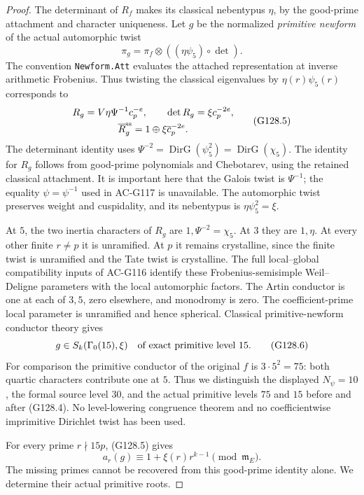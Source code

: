 \begin{proof}
The determinant of \(R_f\) makes its classical nebentypus
\(\eta\), by the good-prime attachment and character uniqueness.
Let \(g\) be the normalized \emph{primitive newform} of the
actual automorphic twist
\[
                 \pi_g=\pi_f\otimes((\eta\psi_5)\circ\det).
 \tag{G128.4}
\]
The convention \texttt{Newform.Att} evaluates the attached
representation at inverse arithmetic Frobenius.  Thus twisting
the classical eigenvalues by \(\eta(r)\psi_5(r)\) corresponds to
\[
 \begin{gathered}
       R_g=V\eta\Psi^{-1}c_p^{-e},\qquad
       \det R_g=\xi c_p^{-2e},\\
       \overline R_g^{\rm ss}=1\oplus\xi\overline c_p^{-2e}.
 \end{gathered}
 \tag{G128.5}
\]
The determinant identity uses
\(\Psi^{-2}=\operatorname{DirG}(\psi_5^2)=\operatorname{DirG}(\chi_5)\).
The identity for \(R_g\) follows from good-prime polynomials
and Chebotarev, using the retained classical attachment.
It is important here that the Galois twist is \(\Psi^{-1}\);
the equality \(\psi=\psi^{-1}\) used in AC-G117 is unavailable.
The automorphic twist preserves weight and cuspidality, and
its nebentypus is \(\eta\psi_5^2=\xi\).

At \(5\), the two inertia characters of \(R_g\) are
\(1,\Psi^{-2}= \chi_5\).  At \(3\) they are \(1,\eta\).
At every other finite \(r\ne p\) it is unramified.
At \(p\) it remains crystalline, since the finite twist is
unramified and the Tate twist is crystalline.
The full local--global compatibility inputs of AC-G116
identify these Frobenius-semisimple Weil--Deligne parameters
with the local automorphic factors.  The Artin conductor is
one at each of \(3,5\), zero elsewhere, and monodromy is zero.
The coefficient-prime local parameter is unramified and hence
spherical.  Classical primitive-newform conductor theory gives
\[
                         g\in S_k(\Gamma_0(15),\xi)
                 \quad\hbox{of exact primitive level }15.
 \tag{G128.6}
\]
For comparison the primitive conductor of the original \(f\)
is \(3\cdot5^2=75\): both quartic characters contribute one
at \(5\).  Thus we distinguish the displayed
\(N_\psi=10\), the formal source level \(30\), and the actual
primitive levels \(75\) and \(15\) before and after (G128.4).
No level-lowering congruence theorem and no coefficientwise
imprimitive Dirichlet twist has been used.

For every prime \(r\nmid15p\), (G128.5) gives
\[
                    a_r(g)\equiv1+\xi(r)r^{k-1}
                                      \pmod{\mathfrak m_E}.
 \tag{G128.7}
\]
The missing primes cannot be recovered from this good-prime
identity alone.  We determine their actual primitive roots.


\end{proof}
